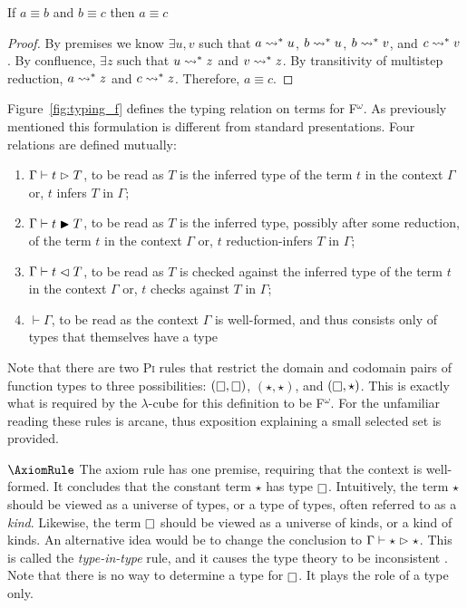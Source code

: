 \begin{theorem}
    If $a \equiv b$ and $b \equiv c$ then $a \equiv c$
\end{theorem}
\begin{proof}
    By premises we know $\exists u, v$ such that $a \rightsquigarrow^* u$, $b \rightsquigarrow^* u$, $b \rightsquigarrow^* v$, and $c \rightsquigarrow^* v$.
    By confluence, $\exists z$ such that $u \rightsquigarrow^* z$ and $v \rightsquigarrow^* z$.
    By transitivity of multistep reduction, $a \rightsquigarrow^* z$ and $c \rightsquigarrow^* z$.
    Therefore, $a \equiv c$.
\end{proof}



Figure~\ref{fig:typing_f} defines the typing relation on terms for F$^\omega$.
As previously mentioned this formulation is different from standard presentations.
Four relations are defined mutually:
\begin{enumerate}
    \item $\Gamma \vdash t \vartriangleright T$, to be read as $T$ is the inferred type of the term $t$ in the context $\Gamma$ or, $t$ infers $T$ in $\Gamma$;
    \item $\Gamma \vdash t \blacktriangleright T$, to be read as $T$ is the inferred type, possibly after some reduction, of the term $t$ in the context $\Gamma$ or, $t$ reduction-infers $T$ in $\Gamma$;
    \item $\Gamma \vdash t \vartriangleleft T$, to be read as $T$ is checked against the inferred type of the term $t$ in the context $\Gamma$ or, $t$ checks against $T$ in $\Gamma$;
    \item $\vdash \Gamma$, to be read as the context $\Gamma$ is well-formed, and thus consists only of types that themselves have a type
\end{enumerate}
Note that there are two \textsc{Pi} rules that restrict the domain and codomain pairs of function types to three possibilities: $(\kind, \kind)$, $(\star, \star)$, and $(\kind, \star)$.
This is exactly what is required by the $\lambda$-cube for this definition to be F$^\omega$.
For the unfamiliar reading these rules is arcane, thus exposition explaining a small selected set is provided.

$\AxiomRule$ The axiom rule has one premise, requiring that the context is well-formed.
It concludes that the constant term $\star$ has type $\kind$.
Intuitively, the term $\star$ should be viewed as a universe of types, or a type of types, often referred to as a \textit{kind}.
Likewise, the term $\kind$ should be viewed as a universe of kinds, or a kind of kinds.
An alternative idea would be to change the conclusion to $\Gamma \vdash \star \vartriangleright \star$.
This is called the \textit{type-in-type} rule, and it causes the type theory to be inconsistent \cite{girard1972,hurkens1995}.
Note that there is no way to determine a type for $\kind$.
It plays the role of a type only.

